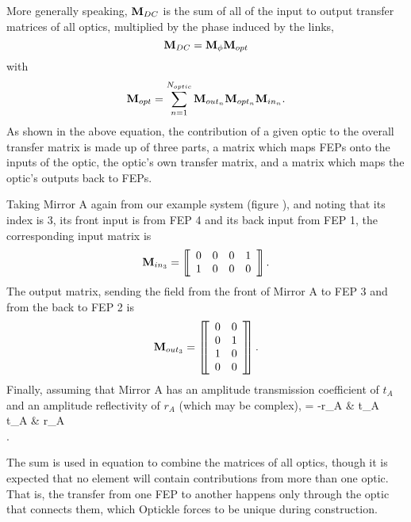 \documentclass[12pt]{article}
\begin{document}
More generally speaking, $\mDC$ is the sum of all of the input to output transfer matrices of all optics, multiplied by the phase induced by the links,
\begin{equation}
\mDC = \mPhi \mOpt
\end{equation}
with
\begin{equation}
\mOpt = \sum_{n=1}^{\Nopt} {\mOutn{n} \mOptn{n} \mInn{n}}.
\elabel{mOpt}
\end{equation}
As shown in the above equation, the contribution of a given optic to the overall transfer matrix is made up of three parts, a matrix which maps FEPs onto the inputs of the optic, the optic's own transfer matrix, and a matrix which maps the optic's outputs back to FEPs.

Taking Mirror A again from our example system (figure ), and noting that its index is 3, its front input is from FEP 4 and its back input from FEP 1, the corresponding input matrix is
\begin{equation*}
\mInn{3} =
\matrixBegin{cccc}
 0 & 0 & 0 & 1 \\
 1 & 0 & 0 & 0 \\
\matrixEnd.
\end{equation*}
The output matrix, sending the field from the front of Mirror A to FEP 3 and from the back to FEP 2 is
\begin{equation*}
\mOutn{3} =
\matrixBegin{cc}
 0 & 0 \\
 0 & 1 \\
 1 & 0 \\
 0 & 0 \\
\matrixEnd.
\end{equation*}
Finally, assuming that Mirror A has an amplitude transmission coefficient of $t_A$ and an amplitude reflectivity of $r_A$ (which may be complex),
 =
 -r_A & t_A \\
 t_A & r_A \\
\matrixEnd
.
\eeq

The sum is used in equation  to combine the matrices of all optics, though it is expected that no element will contain contributions from more than one optic.
That is, the transfer from one FEP to another happens only through the optic that connects them, which Optickle forces to be unique during construction.
\end{document}
